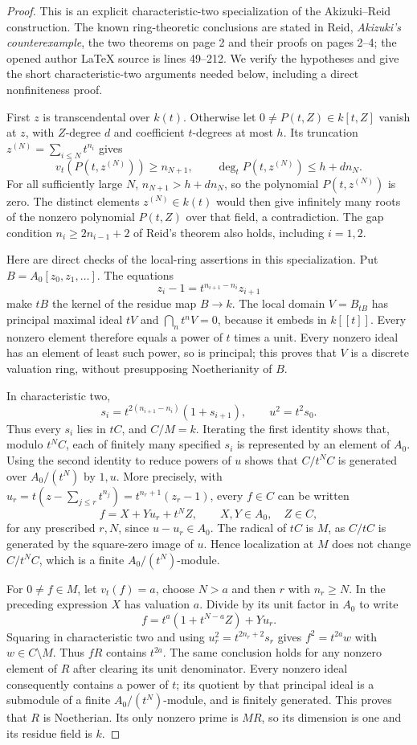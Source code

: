 \begin{proof}
This is an explicit characteristic-two specialization of the
Akizuki--Reid construction. The known ring-theoretic conclusions
are stated in Reid, \emph{Akizuki's counterexample}, the two
theorems on page 2 and their proofs on pages 2--4; the opened
author LaTeX source is lines 49--212. We verify the hypotheses
and give the short characteristic-two arguments needed below,
including a direct nonfiniteness proof.

First $z$ is transcendental over $k(t)$. Otherwise let
$0\ne P(t,Z)\in k[t,Z]$ vanish at $z$, with $Z$-degree $d$
and coefficient $t$-degrees at most $h$. Its truncation
$z^{(N)}=\sum_{i\le N}t^{n_i}$ gives
\[
 v_t(P(t,z^{(N)}))\ge n_{N+1},\qquad
 \deg_t P(t,z^{(N)})\le h+d n_N.
\]
For all sufficiently large $N$, $n_{N+1}>h+dn_N$, so the
polynomial $P(t,z^{(N)})$ is zero. The distinct elements
$z^{(N)}\in k(t)$ would then give infinitely many roots of the
nonzero polynomial $P(t,Z)$ over that field, a contradiction.
The gap condition $n_i\ge2n_{i-1}+2$ of Reid's theorem also
holds, including $i=1,2$.

Here are direct checks of the local-ring assertions in this
specialization. Put $B=A_0[z_0,z_1,\ldots]$. The equations
\[
 z_i-1=t^{n_{i+1}-n_i}z_{i+1}
\]
make $tB$ the kernel of the residue map $B\to k$.
The local domain $V=B_{tB}$ has principal maximal ideal $tV$
and $\bigcap_n t^nV=0$, because it embeds in $k[[t]]$.
Every nonzero element therefore equals a power of $t$ times
a unit. Every nonzero ideal has an element of least such power,
so is principal; this proves that $V$ is a discrete valuation
ring, without presupposing Noetherianity of $B$.

In characteristic two,
\[
 s_i=t^{2(n_{i+1}-n_i)}(1+s_{i+1}),\qquad u^2=t^2s_0.
\]
Thus every $s_i$ lies in $tC$, and $C/M=k$.
Iterating the first identity shows that, modulo $t^NC$,
each of finitely many specified $s_i$ is represented by an
element of $A_0$. Using the second identity to reduce powers
of $u$ shows that $C/t^NC$ is generated over $A_0/(t^N)$ by
$1,u$. More precisely, with
$u_r=t(z-\sum_{j\le r}t^{n_j})=t^{n_r+1}(z_r-1)$,
every $f\in C$ can be written
\[
 f=X+Yu_r+t^NZ,\qquad X,Y\in A_0,\quad Z\in C,
\]
for any prescribed $r,N$, since $u-u_r\in A_0$.
The radical of $tC$ is $M$, as $C/tC$ is generated by the
square-zero image of $u$. Hence localization at $M$ does not
change $C/t^NC$, which is a finite $A_0/(t^N)$-module.

For $0\ne f\in M$, let $v_t(f)=a$, choose $N>a$ and then
$r$ with $n_r\ge N$. In the preceding expression $X$ has
valuation $a$. Divide by its unit factor in $A_0$ to write
\[
 f=t^a(1+t^{N-a}Z)+Yu_r.
\]
Squaring in characteristic two and using
$u_r^2=t^{2n_r+2}s_r$ gives
$f^2=t^{2a}w$ with $w\in C\setminus M$.
Thus $fR$ contains $t^{2a}$. The same conclusion holds for
any nonzero element of $R$ after clearing its unit denominator.
Every nonzero ideal consequently contains a power of $t$;
its quotient by that principal ideal is a submodule of a
finite $A_0/(t^N)$-module, and is finitely generated. This proves
that $R$ is Noetherian. Its only nonzero prime is $MR$, so its
dimension is one and its residue field is $k$.


\end{proof}
